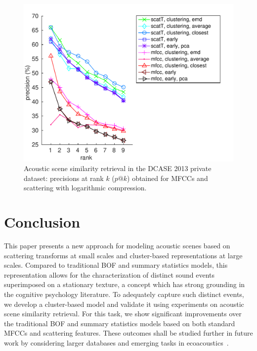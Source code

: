 \documentclass[smallextended]{svjour3}
\begin{document}
\begin{figure}[t]
\begin{center}
\includegraphics[width=\columnwidth]{figures/overall}
\caption{Acoustic scene similarity retrieval in the DCASE 2013 private dataset: precisions at rank $k$ ($p@k$) obtained for MFCCs and scattering with logarithmic compression.}
\label{fig:ASS_1}
\end{center}
\end{figure}

\section{Conclusion}

This paper presents a new approach for modeling acoustic scenes based on scattering transforms at small scales and cluster-based representations at large scales. Compared to traditional BOF and summary statistics models, this representation allows for the characterization of distinct sound events superimposed on a stationary texture, a concept which has strong grounding in the cognitive psychology literature. To adequately capture such distinct events, we develop a cluster-based model and validate it using experiments on acoustic scene similarity retrieval. For this task, we show significant improvements over the traditional BOF and summary statistics models based on both standard MFCCs and scattering features.
These outcomes shall be studied further in future work by considering larger databases and emerging tasks in ecoacoustics~\cite{sueur2015ecoacoustics, wimmer2013sampling}.
\end{document}
